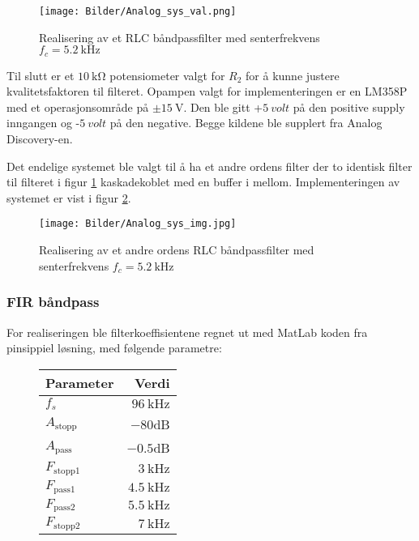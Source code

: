 \begin{figure}[H]
    \centering
    \texttt{[image: Bilder/Analog\_sys\_val.png]}
    \caption{Realisering av et RLC båndpassfilter med senterfrekvens $f_c = \SI{5.2}{\kilo\hertz}$}
    \label{fig:impl_rcl_sys}
\end{figure}

Til slutt er et $\SI{10}{\kilo\ohm}$ potensiometer valgt for $R_2$ for å kunne justere kvalitetsfaktoren
til filteret. Opampen valgt for implementeringen er en LM358P \cite{lf353_opamp} med et operasjonsområde på 
$\pm \SI{15}{\volt}$. Den ble gitt +$\SI{5}{volt}$ på den positive supply inngangen og -$\SI{5}{volt}$ på den negative.
Begge kildene ble supplert fra Analog Discovery-en.

Det endelige systemet ble valgt til å ha et andre ordens filter der to identisk filter til filteret i figur \ref{fig:impl_rcl_sys} 
kaskadekoblet med en buffer i mellom. Implementeringen av systemet er vist i figur \ref{fig:impl_rcl_sys_img}.

\begin{figure}[H]
    \centering
    \texttt{[image: Bilder/Analog\_sys\_img.jpg]}
    \caption{Realisering av et andre ordens RLC båndpassfilter med senterfrekvens $f_c = \SI{5.2}{\kilo\hertz}$}
    \label{fig:impl_rcl_sys_img}
\end{figure}

\subsubsection{FIR båndpass}
For realiseringen ble filterkoeffisientene regnet ut med MatLab koden fra pinsippiel løsning,
med følgende parametre: 
\begin{figure}[H]
    \label{fig:fir_filter_params}
    \centering
    \begin{tabular}{|l|r|}
        \hline
        \textbf{Parameter} & \textbf{Verdi} \\
        \hline
        $f_s$ & $\SI{96}{\kilo\hertz}$ \\
        \hline
        $A_\text{stopp}$ & $-80$dB \\
        \hline
        $A_\text{pass}$ & $-0.5$dB \\
        \hline
        $F_\text{stopp1}$ & $\SI{3}{\kilo\hertz}$ \\
        \hline
        $F_\text{pass1}$ & $\SI{4.5}{\kilo\hertz}$ \\
        \hline
        $F_\text{pass2}$ & $\SI{5.5}{\kilo\hertz}$ \\
        \hline
        $F_\text{stopp2}$ & $\SI{7}{\kilo\hertz}$ \\
        \hline
    \end{tabular} 
\end{figure}

